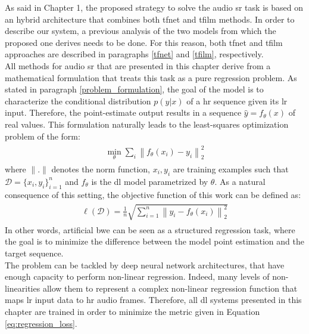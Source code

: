 As said in Chapter 1, the proposed strategy to solve the audio \gls{sr} task is based on an hybrid architecture that combines both \gls{tfnet} \cite{lim2018time} and \gls{tfilm} \cite{birnbaum2019temporal} methods. In order to describe our system, a previous analysis of the two models from which the proposed one derives needs to be done. For this reason, both \gls{tfnet} and \gls{tfilm} approaches are described in paragraphs \ref{tfnet} and \ref{tfilm}, respectively. \\
All methods for audio \gls{sr} that are presented in this chapter derive from a mathematical formulation that treats this task as a pure regression problem.
As stated in paragraph \ref{problem_formulation}, the goal of the model is to characterize the conditional distribution $p(y|x)$ of a \gls{hr} sequence given its \gls{lr} input. Therefore, the point-estimate output results in a sequence $\hat{y} = f_{\theta}(x)$ of real values. This formulation naturally leads to the least-squares optimization problem of the form:
\begin{align}\label{eq:regression_formulation}
	\begin{array}{c}
		\min _{\theta} \sum_{i}\left\|f_{\theta}(x_{i})-y_{i}\right\|_{2}^{2}
	\end{array}
\end{align}
where $\|.\|$ denotes the norm function, $x_i, y_i$ are training examples such that $\mathcal{D} = \{x_i, y_i\}_{i = 1}^n$ and $f_{\theta}$ is the \gls{dl} model parametrized by $\theta$. As a natural consequence of this setting, the objective function of this work can be defined as:
\begin{align}\label{eq:regression_loss}
	\begin{array}{c}
		\ell(\mathcal{D})=\frac{1}{n} \sqrt{\sum_{i=1}^{n}\left\|y_{i}-f_{\theta}\left(x_{i}\right)\right\|_{2}^{2}}
	\end{array}
\end{align}
In other words, artificial \gls{bwe} can be seen as a structured regression task, where the goal is to minimize the difference between the model point estimation and the target sequence. \\
The problem can be tackled by deep neural network architectures, that have enough capacity to perform non-linear regression. Indeed, many levels of non-linearities allow them to represent a complex non-linear regression function that maps \gls{lr} input data to \gls{hr} audio frames. Therefore, all \gls{dl} systems presented in this chapter are trained in order to minimize the metric given in Equation \ref{eq:regression_loss}. \\
